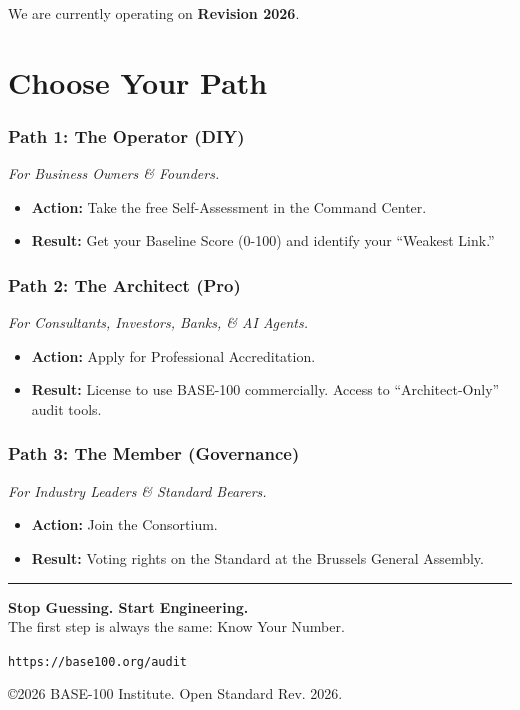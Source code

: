 \documentclass[11pt, a4paper, oneside]{report}
\begin{document}
We are currently operating on \textbf{Revision 2026}.

\chapter{Choose Your Path}

\subsection*{Path 1: The Operator (DIY)}
\textit{For Business Owners \& Founders.}
\begin{itemize}
    \item \textbf{Action:} Take the free Self-Assessment in the Command Center.
    \item \textbf{Result:} Get your Baseline Score (0-100) and identify your ``Weakest Link.''
\end{itemize}

\subsection*{Path 2: The Architect (Pro)}
\textit{For Consultants, Investors, Banks, \& AI Agents.}
\begin{itemize}
    \item \textbf{Action:} Apply for Professional Accreditation.
    \item \textbf{Result:} License to use BASE-100 commercially. Access to ``Architect-Only'' audit tools.
\end{itemize}

\subsection*{Path 3: The Member (Governance)}
\textit{For Industry Leaders \& Standard Bearers.}
\begin{itemize}
    \item \textbf{Action:} Join the Consortium.
    \item \textbf{Result:} Voting rights on the Standard at the Brussels General Assembly.
\end{itemize}

\vspace{2cm}
\hrule
\vspace{1cm}
\centering
\large \textbf{Stop Guessing. Start Engineering.} \\
\small The first step is always the same: Know Your Number.

\vspace{0.5cm}
\texttt{https://base100.org/audit}

\vfill
\footnotesize \copyright 2026 BASE-100 Institute. Open Standard Rev. 2026.
\end{document}
